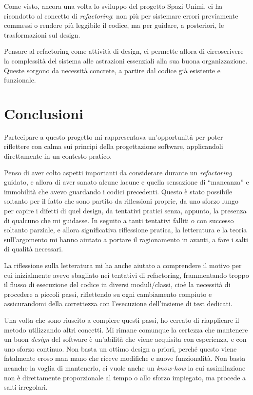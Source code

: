 \documentclass[12pt]{report}
\begin{document}
Come visto, ancora una volta lo sviluppo del progetto Spazi Unimi,
ci ha ricondotto al concetto di \textit{refactoring}: non più per sistemare
errori previamente commessi o rendere più leggibile il codice, 
ma per guidare, a posteriori, le trasformazioni sul design. 

Pensare al refactoring come attività di design, 
ci permette allora di circoscrivere la complessità del sistema alle 
astrazioni essenziali alla sua buona organizzazione. Queste sorgono 
da necessità concrete, a partire dal codice già esistente e funzionale.


\chapter{Conclusioni}

Partecipare a questo progetto mi rappresentava un'opportunità per poter
riflettere con calma sui principi della progettazione software, applicandoli
direttamente in un contesto pratico. 


Penso di aver colto aspetti importanti da considerare durante un 
\textit{refactoring} guidato, e allora di aver sanato alcune lacune e 
quella sensazione di ``mancanza'' e immobilità che avevo guardando i codici 
precedenti. Questo è stato possibile soltanto per il fatto che sono 
partito da riflessioni proprie, da uno sforzo lungo per capire i 
difetti di quel design, da tentativi pratici senza, appunto, 
la presenza di qualcuno che mi guidasse. In seguito a tanti tentativi
falliti o con successo soltanto parziale, e allora significativa riflessione
pratica, la letteratura e la teoria sull'argomento mi hanno aiutato a 
portare il ragionamento in avanti, a fare i salti di qualità
necessari.

La riflessione sulla letteratura mi ha anche aiutato a comprendere il 
motivo per cui inizialmente avevo sbagliato nei tentativi di refactoring,
frammentando troppo il flusso di esecuzione del codice 
in diversi moduli/classi, cioè la necessità
di procedere a piccoli passi, riflettendo su ogni
cambiamento compiuto e assicurandomi della correttezza con
l'esecuzione dell'insieme di test dedicati. 

Una volta che sono riuscito a compiere questi passi, ho cercato di riapplicare
il metodo utilizzando altri concetti. Mi rimane comunque la certezza che
mantenere un buon \textit{design} del software è un'abilità che viene acquisita
con esperienza, e con uno sforzo continuo. Non basta un ottimo design a
priori, perché questo viene fatalmente eroso man mano che riceve modifiche
e nuove funzionalità. Non basta neanche la voglia di mantenerlo, ci vuole
anche un \textit{know-how} la cui assimilazione non è direttamente 
proporzionale al tempo o allo sforzo impiegato, ma procede a salti irregolari.
\end{document}
